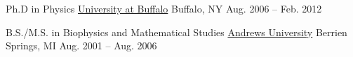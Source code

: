 

\begin{cventries}
  \cventry
    {Ph.D in Physics}                                  %
    {\href{www.buffalo.edu}{University at Buffalo}}    %
    {Buffalo, NY}                                      %
    {Aug. 2006 -- Feb. 2012}                           %
    { }%


  \cventry
    {B.S./M.S. in Biophysics and Mathematical Studies} %
    {\href{www.andrews.edu}{Andrews University}}       %
    {Berrien Springs, MI}                              %
    {Aug. 2001 -- Aug. 2006}                           %
    {}%

\end{cventries}




